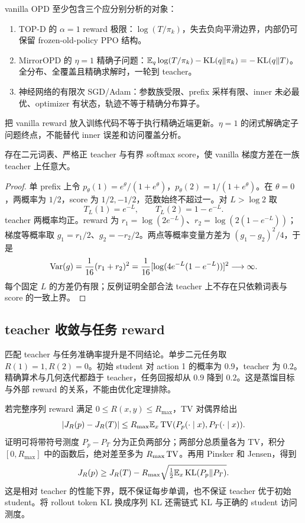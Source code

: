vanilla OPD 至少包含三个应分别分析的对象：
\begin{enumerate}
 \item TOP-D 的 $\alpha=1$ reward 极限：$\log(T/\pi_k)$，失去负向平滑边界，内部仍可保留 frozen-old-policy PPO 结构。
 \item MirrorOPD 的 $\eta=1$ 精确子问题：$\mathbb{E}_q\log(T/\pi_k)-\operatorname{KL}(q\Vert\pi_k)=-\operatorname{KL}(q\Vert T)$。全分布、全覆盖且精确求解时，一轮到 teacher。
 \item 神经网络的有限次 SGD/Adam：参数族受限、prefix 采样有限、inner 未必最优、optimizer 有状态，轨迹不等于精确分布算子。
\end{enumerate}
把 vanilla reward 放入训练代码不等于执行精确近端更新。$\eta=1$ 的闭式解确定子问题终点，不能替代 inner 误差和访问覆盖分析。

\begin{proposition}
存在二元词表、严格正 teacher 与有界 softmax score，使 vanilla 梯度方差在一族 teacher 上任意大。
\end{proposition}
\begin{proof}
单 prefix 上令 $p_\theta(1)=e^\theta/(1+e^\theta)$，$p_\theta(2)=1/(1+e^\theta)$。在 $\theta=0$，两概率为 $1/2$，score 为 $1/2,-1/2$，范数始终不超过一。对 $L>\log2$ 取
\[
 T_L(1)=e^{-L},\qquad T_L(2)=1-e^{-L}.
\]
teacher 两概率均正。reward 为 $r_1=\log(2e^{-L})$、$r_2=\log(2(1-e^{-L}))$；梯度等概率取 $g_1=r_1/2$、$g_2=-r_2/2$。两点等概率变量方差为 $(g_1-g_2)^2/4$，于是
\[
 \operatorname{Var}(g)=\frac1{16}(r_1+r_2)^2
 =\frac1{16}[\log(4e^{-L}(1-e^{-L}))]^2\longrightarrow\infty.
\]
每个固定 $L$ 的方差仍有限；反例证明全部合法 teacher 上不存在只依赖词表与 score 的一致上界。
\end{proof}

\subsection{teacher 收敛与任务 reward}

匹配 teacher 与任务准确率提升是不同结论。单步二元任务取 $R(1)=1,R(2)=0$。初始 student 对 action 1 的概率为 $0.9$，teacher 为 $0.2$。精确算术与几何迭代都趋于 teacher，任务回报却从 $0.9$ 降到 $0.2$。这是蒸馏目标与外部 reward 的关系，不能由优化定理排除。

若完整序列 reward 满足 $0\leq R(x,y)\leq R_{\max}$，TV 对偶界给出
\[
 |J_R(p)-J_R(T)|\leq R_{\max}\mathbb{E}_x\operatorname{TV}(P_p(\cdot\mid x),P_T(\cdot\mid x)).
\]
证明可将带符号测度 $P_p-P_T$ 分为正负两部分；两部分总质量各为 TV，积分 $[0,R_{\max}]$ 中的函数后，绝对差至多为 $R_{\max}\operatorname{TV}$。再用 Pinsker 和 Jensen，得到
\[
 J_R(p)\geq J_R(T)-R_{\max}\sqrt{\tfrac12\mathbb{E}_x\operatorname{KL}(P_p\Vert P_T)}.
\]
这是相对 teacher 的性能下界，既不保证每步单调，也不保证 teacher 优于初始 student。将 rollout token KL 换成序列 KL 还需链式 KL 与正确的 student 访问测度。


